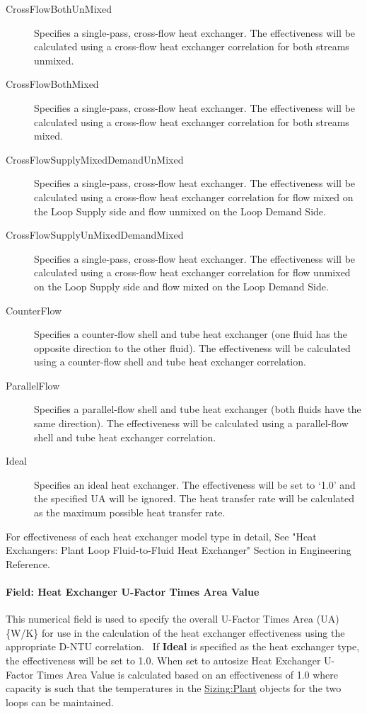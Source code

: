 \begin{description}
\item [CrossFlowBothUnMixed] Specifies a single-pass, cross-flow heat exchanger. The effectiveness will be calculated using a cross-flow heat exchanger correlation for both streams unmixed.
\item [CrossFlowBothMixed]  Specifies a single-pass, cross-flow heat exchanger. The effectiveness will be calculated using a cross-flow heat exchanger correlation for both streams mixed.
\item [CrossFlowSupplyMixedDemandUnMixed] Specifies a single-pass, cross-flow heat exchanger. The effectiveness will be calculated using a cross-flow heat exchanger correlation for flow mixed on the Loop Supply side and flow unmixed on the Loop Demand Side.
\item [CrossFlowSupplyUnMixedDemandMixed] Specifies a single-pass, cross-flow heat exchanger. The effectiveness will be calculated using a cross-flow heat exchanger correlation for flow unmixed on the Loop Supply side and flow mixed on the Loop Demand Side.
\item [CounterFlow] Specifies a counter-flow shell and tube heat exchanger (one fluid has the opposite direction to the other fluid). The effectiveness will be calculated using a counter-flow shell and tube heat exchanger correlation.
\item [ParallelFlow] Specifies a parallel-flow shell and tube heat exchanger (both fluids have the same direction). The effectiveness will be calculated using a parallel-flow shell and tube heat exchanger correlation.
\item [Ideal] Specifies an ideal heat exchanger. The effectiveness will be set to `1.0' and the specified UA will be ignored. The heat transfer rate will be calculated as the maximum possible heat transfer rate.
\end{description}

For effectiveness of each heat exchanger model type in detail, See "Heat Exchangers: Plant Loop Fluid-to-Fluid Heat Exchanger" Section in Engineering Reference.

\paragraph{Field: Heat Exchanger U-Factor Times Area Value}\label{field-heat-exchanger-u-factor-times-area-value}

This numerical field is used to specify the overall U-Factor Times Area (UA) \{W/K\} for use in the calculation of the heat exchanger effectiveness using the appropriate D-NTU correlation.~ If \textbf{Ideal} is specified as the heat exchanger type, the effectiveness will be set to 1.0. When set to autosize Heat Exchanger U-Factor Times Area Value is calculated based on an effectiveness of 1.0 where capacity is such that the temperatures in the \hyperref[sizingplant]{Sizing:Plant} objects for the two loops can be maintained.

